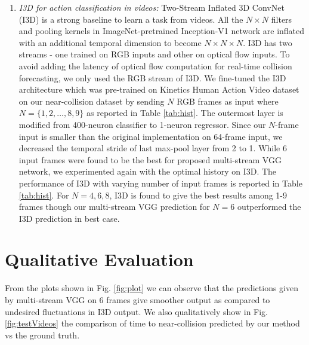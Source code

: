 \begin{enumerate}
    \item \textit{I3D for action classification in videos:} Two-Stream Inflated 3D ConvNet (I3D) \cite{i3d} is a strong baseline to learn a task from videos. All the $ N \times N$ filters and pooling kernels in ImageNet-pretrained Inception-V1 network \cite{inceptionv1} are inflated with an additional temporal dimension to become $N \times N \times N$. I3D has two streams - one trained on RGB inputs and other on optical flow inputs. To avoid adding the latency of optical flow computation for real-time collision forecasting, we only used the RGB stream of I3D. We fine-tuned the I3D architecture which was pre-trained on Kinetics Human Action Video dataset \cite{i3d} on our near-collision dataset by sending $N$ RGB frames as input where $N = \{1,2, \hdots, 8,9\}$ as reported in Table \ref{tab:hist}. The outermost layer is modified from 400-neuron classifier to 1-neuron regressor. Since our $N$-frame input is smaller than the original implementation on 64-frame input, we decreased the temporal stride of last max-pool layer from 2 to 1. While 6 input frames were found to be the best for proposed multi-stream VGG network, we experimented again with the optimal history on I3D. The performance of I3D with varying number of input frames is reported in Table \ref{tab:hist}.  For $N = 4, 6, 8$, I3D is found to give the best results among 1-9 frames though our multi-stream VGG prediction for $N = 6$ outperformed the I3D prediction in best case. 
\end{enumerate}
\section{Qualitative Evaluation}
From the plots shown in Fig. \ref{fig:plot} we can observe that the predictions given by multi-stream VGG on 6 frames give smoother output as compared to undesired fluctuations in I3D output. We also qualitatively show in Fig. \ref{fig:testVideos} the comparison of time to near-collision predicted by our method vs the ground truth. 
